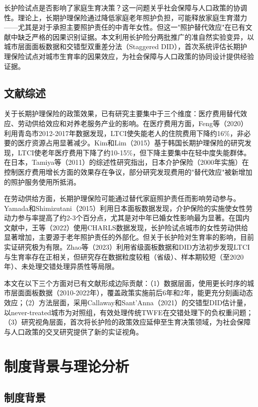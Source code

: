 \documentclass[11pt,a4paper]{article}
\begin{document}
长护险试点是否影响了家庭生育决策？这一问题关乎社会保障与人口政策的协调性。理论上，长期护理保险通过降低家庭老年照护负担，可能释放家庭生育潜力——尤其是对于承担主要照护责任的中青年女性。但这一"照护替代效应"在已有文献中缺乏严格的因果识别证据。本文利用长护险分两批推广的准自然实验变异，以城市层面面板数据和交错型双重差分法（Staggered DID），首次系统评估长期护理保险试点对城市生育率的因果效应，为社会保障与人口政策的协同设计提供经验证据。

\subsection{文献综述}

关于长期护理保险的政策效果，已有研究主要集中于三个维度：医疗费用替代效应、劳动供给效应和对养老服务产业的影响。在医疗费用方面，Feng等（2020）利用青岛市2012-2017年数据发现，LTCI使失能老人的住院费用下降约16\%，非必要的医疗资源占用显著减少。Kim和Lim（2015）基于韩国长期护理保险的研究发现，LTCI使老年医疗费用下降了约10-15\%，但下降主要集中在轻中度失能群体。在日本，Tamiya等（2011）的综述性研究指出，日本介护保险（2000年实施）在控制医疗费用增长方面的效果存在争议，部分研究发现费用的"替代效应"被新增加的照护服务使用所抵消。

在劳动供给方面，长期护理保险可能通过替代家庭照护责任而影响劳动参与。Yamada和Shimizutani（2015）利用日本面板数据发现，介护保险的实施使女性劳动力参与率提高了约2-3个百分点，尤其是对中年已婚女性影响最为显著。在国内文献中，王等（2022）使用CHARLS数据发现，长护险试点城市的女性劳动供给显著增加，主要源于老年照护责任的外部化。但关于长护险对生育率的影响，目前实证研究极为有限。Zhao等（2023）利用省级面板数据和DID方法初步发现LTCI与生育率存在正相关，但研究存在数据粒度较粗（省级）、样本期较短（至2020年）、未处理交错处理异质性等局限。

本文在以下三个方面对已有文献形成边际贡献：（1）数据层面，使用更长时序的城市层面面板数据（2010-2022年），覆盖政策实施前后6年和2年，能更充分刻画动态效应；（2）方法层面，采用Callaway和Sant'Anna（2021）的交错型DID估计量，以never-treated城市为对照组，有效处理传统TWFE在交错处理下的负权重问题；（3）研究视角层面，首次将长护险的政策效应延伸至生育决策领域，为社会保障与人口政策的交叉研究提供了新的实证视角。

\section{制度背景与理论分析}
\subsection{制度背景}
\end{document}
